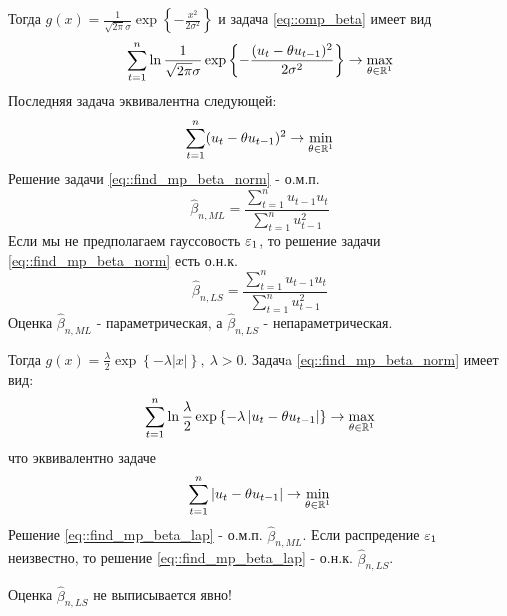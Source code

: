\begin{example}
    Тогда $g(x)=\frac{1}{\sqrt{2\pi}\sigma}\exp{\left\{-\frac{x^2}{2\sigma^2}\right\}}$
    и задача \eqref{eq::omp_beta} имеет вид
    \[\sum_{t=1}^n\ln\frac{1}{\sqrt{2\pi}\sigma}\exp{\left\{-\frac{(u_t-\theta u_{t-1})^2}{2\sigma^2}\right\}}\rightarrow\max_{\theta\in\mathbb{R}^1}\]
    Последняя задача эквивалентна следующей:
    \begin{equation}\label{eq::find_mp_beta_norm}
        \sum_{t=1}^n(u_t-\theta u_{t-1})^2\rightarrow\min_{\theta\in\mathbb{R}^1}
    \end{equation}
    Решение задачи \eqref{eq::find_mp_beta_norm} - о.м.п.
    \begin{equation}
        \widehat{\beta}_{n, ML}=\frac{\sum_{t=1}^nu_{t-1}u_t}{\sum_{t=1}^nu_{t-1}^2}
    \end{equation}
    Если мы не предполагаем гауссовость $\varepsilon_1$, то решение задачи \eqref{eq::find_mp_beta_norm} есть о.н.к.
    \begin{equation}
        \widehat{\beta}_{n,LS}=\frac{\sum_{t=1}^nu_{t-1}u_t}{\sum_{t=1}^nu^2_{t-1}}
    \end{equation}
    Оценка $\widehat{\beta}_{n, ML}$ - параметрическая, а $\widehat{\beta}_{n, LS}$ - непараметрическая.
\end{example}
\begin{example}
    Тогда $g(x)=\frac{\lambda}{2}\exp{\left\{-\lambda\left\lvert x\right\rvert \right\}},\ \lambda>0$. Задачa \eqref{eq::find_mp_beta_norm} имеет вид:
    \[\sum_{t=1}^n\ln\frac{\lambda}{2}\exp{\left\{-\lambda\left\lvert u_t-\theta u_{t-1}\right\rvert \right\}}\rightarrow\max_{\theta\in\mathbb{R}^1}\]
    что эквивалентно задаче
    \begin{equation}\label{eq::find_mp_beta_lap}
        \sum_{t=1}^n\left\lvert u_t-\theta u_{t-1}\right\rvert \rightarrow\min_{\theta\in\mathbb{R}^1}
    \end{equation}
    Решение \eqref{eq::find_mp_beta_lap} - о.м.п. $\widehat{\beta}_{n,ML}$.
    Если распредение $\varepsilon_1$ неизвестно, то решение \eqref{eq::find_mp_beta_lap} - о.н.к. $\widehat{\beta}_{n,LS}$.

    Оценка $\widehat{\beta}_{n,LS}$ не выписывается явно!
\end{example}


